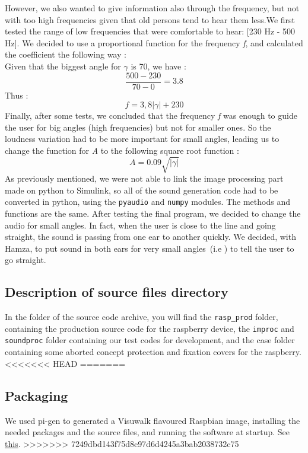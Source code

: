 \documentclass{rapport}
\begin{document}
However, we also wanted to give information also through the frequency, but not with too high frequencies given that old persons tend to hear them less.We first tested the range of low frequencies that were comfortable to hear: [230 Hz - 500 Hz]. We decided to use a proportional function for the frequency \emph{f}, and calculated the coefficient the following way :\\
Given that the biggest angle for \(\gamma\) is 70, we have :
\[ \frac{500 - 230}{70 -0} = 3.8\]
Thus : 
\[ f = 3,8 |\gamma| + 230\]
Finally, after some tests, we concluded that the frequency \emph{f} was enough to guide the user for big angles (high frequencies) but not for smaller ones. So the loudness variation had to be more important for small angles, leading us to change the function for \emph{A} to the following square root function :
\[ A = 0.09\sqrt{|\gamma|} \]
As previously mentioned, we were not able to link the image processing part made on python to Simulink, so all of the sound generation code had to be converted in python, using the \verb|pyaudio| and \verb|numpy| modules. The methods and functions are the same.
After testing the final program, we decided to change the audio for small angles. In fact, when the user is close to the line and going straight, the sound is passing from one ear to another quickly. We decided, with Hamza, to put sound in both ears for very small angles\ (i.e \gamma \in [-4,4])\) to tell the user to go straight.



\subsection{Description of source files directory}

In the folder of the source code archive, you will find the \verb|rasp_prod| folder, containing the production source code for the raspberry device, the \verb|improc| and \verb|soundproc| folder containing our test codes for development, and the case folder containing some aborted concept protection and fixation covers for the raspberry.
<<<<<<< HEAD
=======

\subsection{Packaging}

We used pi-gen to generated a Visuwalk flavoured Raspbian image, installing the needed packages and the source files, and running the software at startup. See \href{https://github.com/RPi-Distro/pi-gen}{this}.
>>>>>>> 7249dbd143f75d8c97d6d4245a3bab2038732c75
\end{document}

